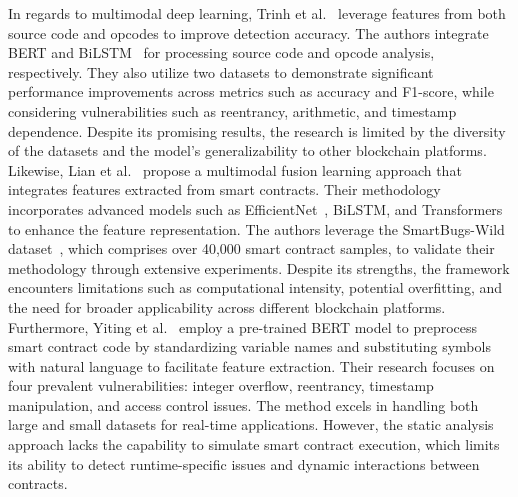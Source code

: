 \documentclass[5p,twocolumn]{elsarticle}
\begin{document}
In regards to multimodal deep learning, Trinh et al.~\cite{trinh2023multimodal} leverage features from both source code and opcodes to improve detection accuracy. The authors integrate BERT and BiLSTM~\cite{bin2016bidirectional} for processing source code and opcode analysis, respectively. They also utilize two datasets to demonstrate significant performance improvements across metrics such as accuracy and F1-score, while considering vulnerabilities such as reentrancy, arithmetic, and timestamp dependence. Despite its promising results, the research is limited by the diversity of the datasets and the model's generalizability to other blockchain platforms. Likewise, Lian et al.~\cite{lian2024universal} propose a multimodal fusion learning approach that integrates features extracted from smart contracts. Their methodology incorporates advanced models such as EfficientNet~\cite{tan2019efficientnet}, BiLSTM, and Transformers~\cite{vaswani2017attention} to enhance the feature representation. The authors leverage the SmartBugs-Wild dataset~\cite{web-smartbug-dataset}, which comprises over 40,000 smart contract samples, to validate their methodology through extensive experiments. Despite its strengths, the framework encounters limitations such as computational intensity, potential overfitting, and the need for broader applicability across different blockchain platforms. Furthermore, Yiting et al.~\cite{yiting2024automated} employ a pre-trained BERT model to preprocess smart contract code by standardizing variable names and substituting symbols with natural language to facilitate feature extraction. Their research focuses on four prevalent vulnerabilities: integer overflow, reentrancy, timestamp manipulation, and access control issues. The method excels in handling both large and small datasets for real-time applications. However, the static analysis approach lacks the capability to simulate smart contract execution, which limits its ability to detect runtime-specific issues and dynamic interactions between contracts.
\end{document}
